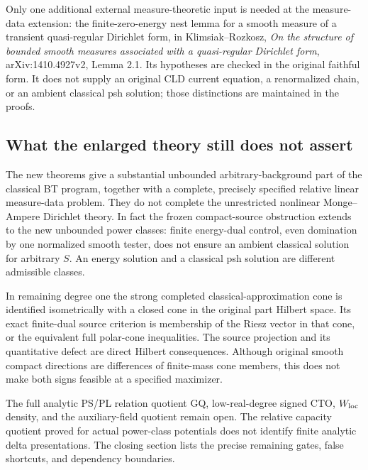 \documentclass[11pt,a4paper]{article}
\numberwithin{equation}{section}
\theoremstyle{definition}
\theoremstyle{remark}
\begin{document}
Only one additional external measure-theoretic
input is needed at the measure-data extension:
the finite-zero-energy nest lemma for a smooth
measure of a transient quasi-regular Dirichlet
form, in Klimsiak--Rozkosz,
\emph{On the structure of bounded smooth measures
associated with a quasi-regular Dirichlet form},
arXiv:1410.4927v2, Lemma 2.1.
Its hypotheses are checked in the original
faithful form.  It does not supply an original
CLD current equation, a renormalized chain,
or an ambient classical psh solution; those
distinctions are maintained in the proofs.

\subsection{What the enlarged theory still does not assert}

The new theorems give a substantial unbounded
arbitrary-background part of the classical BT
program, together with a complete, precisely
specified relative linear measure-data problem.
They do not complete the unrestricted nonlinear
Monge--Ampere Dirichlet theory.
In fact the frozen compact-source obstruction
extends to the new unbounded power classes:
finite energy-dual control, even domination by
one normalized smooth tester, does not ensure
an ambient classical solution for arbitrary $S$.
An energy solution and a classical psh solution
are different admissible classes.

In remaining degree one the strong completed classical-approximation
cone is identified isometrically with a closed cone in the
original part Hilbert space. Its exact finite-dual source
criterion is membership of the Riesz vector in that cone,
or the equivalent full polar-cone inequalities. The source
projection and its quantitative defect are direct Hilbert
consequences. Although original smooth compact directions
are differences of finite-mass cone members, this does not
make both signs feasible at a specified maximizer.

The full analytic PS/PL relation quotient GQ,
low-real-degree signed CTO, $W_{\rm loc}$ density,
and the auxiliary-field quotient remain open.
The relative capacity quotient proved for
actual power-class potentials does not identify
finite analytic delta presentations.
The closing section lists the precise remaining
gates, false shortcuts, and dependency boundaries.



\end{document}
